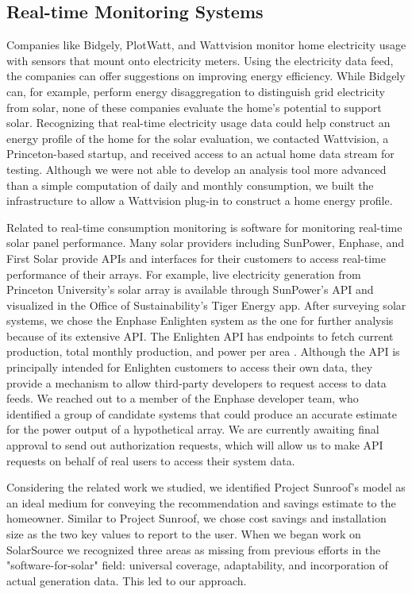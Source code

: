 \documentclass[pageno]{jpaper}
\begin{document}
\subsection{Real-time Monitoring Systems}
Companies like Bidgely, PlotWatt, and Wattvision monitor home electricity usage with sensors that mount onto electricity meters. Using the electricity data feed, the companies can offer suggestions on improving energy efficiency. While Bidgely can, for example, perform energy disaggregation to distinguish grid electricity from solar, none of these companies evaluate the home's potential to support solar. Recognizing that real-time electricity usage data could help construct an energy profile of the home for the solar evaluation, we contacted Wattvision, a Princeton-based startup, and received access to an actual home data stream for testing. Although we were not able to develop an analysis tool more advanced than a simple computation of daily and monthly consumption, we built the infrastructure to allow a Wattvision plug-in to construct a home energy profile.

Related to real-time consumption monitoring is software for monitoring real-time solar panel performance. Many solar providers including SunPower, Enphase, and First Solar provide APIs and interfaces for their customers to access real-time performance of their arrays. For example, live electricity generation from Princeton University's solar array is available through SunPower's API and visualized in the Office of Sustainability's Tiger Energy app. After surveying solar systems, we chose the Enphase Enlighten system as the one for further analysis because of its extensive API. The Enlighten API has endpoints to fetch current production, total monthly production, and power per area \cite{Enlighten}. Although the API is principally intended for Enlighten customers to access their own data, they provide a mechanism to allow third-party developers to request access to data feeds. We reached out to a member of the Enphase developer team, who identified a group of candidate systems that could produce an accurate estimate for the power output of a hypothetical array. We are currently awaiting final approval to send out authorization requests, which will allow us to make API requests on behalf of real users to access their system data.

Considering the related work we studied, we identified Project Sunroof's model as an ideal medium for conveying the recommendation and savings estimate to the homeowner. Similar to Project Sunroof, we chose cost savings and installation size as the two key values to report to the user. When we began work on SolarSource we recognized three areas as missing from previous efforts in the "software-for-solar" field: universal coverage, adaptability, and incorporation of actual generation data. This led to our approach.
\end{document}
